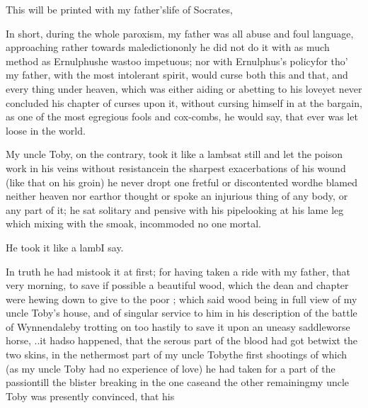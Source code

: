 \documentclass{article}
\begin{document}
\bigskip
\vbox{\fontsize{8}{10}\selectfont{}}

\bgroup\fontsize{9}{11}\selectfont
\indent\fnast\enspace This will be printed with my
father’s\break life of Socrates, \etc \etc\par
\egroup
{}\eject

In short, during the whole paroxism, my father was all abuse and foul language,
approaching rather towards malediction\tsh only he did not do it with as much method
as Ernulphus\tsh he was\break too impetuous; nor with Ernulphus’s policy\tsh for tho’ my
father, with the most intolerant spirit, would curse both this and that, and every
thing under heaven, which was either aiding or abetting to his love\tsh yet never
concluded his chapter of curses upon it, without cursing himself in at the bargain,
as one of the most egregious fools and cox-\break combs, he would say, that ever was let
loose in the world.

My uncle Toby, on the contrary, took it like a
lamb\tsh sat still and let the poison work in his veins
without resistance\tsh in the sharpest exacerbations of
his wound (like that on his groin) he never dropt one fretful or
discontented word\tsh he blamed neither heaven nor
earth\tsh or thought or spoke an inju\-rious thing of any
body, or any part of it; he sat solitary and pensive with his
pipe\tsh looking at his lame leg \tsh\break 
{}
which mixing with the smoak, incommoded no one
mortal.

He took it like a lamb\tsh I say.


In truth he had mistook it at first; for having taken a ride with my father, that
very morning, to save if possible a beautiful wood, which the dean and chapter were
hewing down to give to the poor \fnast;\break
which said wood
being in full view of my uncle Toby’s house, and of singular service to him in his
description of the battle of Wynnendale\tsk by trotting on too hastily to save it\tsh
upon an uneasy saddle\tsh worse horse, \etc \etc .\@ .\@  it had\break so happened, that the
serous part of the blood had got betwixt the two skins, in the nethermost part of my
uncle Toby\break\tsk the first shootings of which (as my uncle Toby had no
experience of love) he had taken for a part of the passion\tsk\break till the blister
breaking in the one case\tsk\break and the other remaining\tsk my uncle Toby was presently
convinced, that his{\par}
\end{document}
